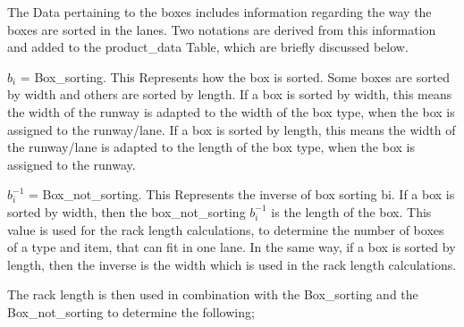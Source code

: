 \documentclass[
]{article}
\begin{document}
The Data pertaining to the boxes includes information regarding the way
the boxes are sorted in the lanes. Two notations are derived from this
information and added to the product\_data Table, which are briefly
discussed below.

\(b_i\) = Box\_sorting. This Represents how the box is sorted. Some
boxes are sorted by width and others are sorted by length. If a box is
sorted by width, this means the width of the runway is adapted to the
width of the box type, when the box is assigned to the runway/lane. If a
box is sorted by length, this means the width of the runway/lane is
adapted to the length of the box type, when the box is assigned to the
runway.

\(b_i^{-1}\) = Box\_not\_sorting. This Represents the inverse of box
sorting bi. If a box is sorted by width, then the box\_not\_sorting
\(b_i^{-1}\) is the length of the box. This value is used for the rack
length calculations, to determine the number of boxes of a type and
item, that can fit in one lane. In the same way, if a box is sorted by
length, then the inverse is the width which is used in the rack length
calculations.

The rack length is then used in combination with the Box\_sorting and
the Box\_not\_sorting to determine the following;
\end{document}
